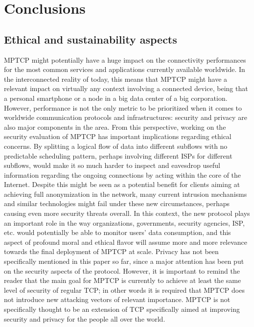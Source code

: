 \chapter{Conclusions}
\label{chap:conclusions}

\section{Ethical and sustainability aspects}
MPTCP might potentially have a huge impact on the connectivity performances for the most common services and applications currently available worldwide. In the interconnected reality of today, this means that MPTCP might have a relevant impact on virtually any context involving a connected device, being that a personal smartphone or a node in a big data center of a big corporation. 
However, performance is not the only metric to be prioritized when it comes to worldwide communication protocols and infrastructures: security and privacy are also major components in the area. From this perspective, working on the security evaluation of MPTCP has important implications regarding ethical concerns.
By splitting a logical flow of data into different subflows with no predictable scheduling pattern, perhaps involving different ISPs for different subflows, would make it so much harder to inspect and eavesdrop useful information regarding the ongoing connections by acting within the core of the Internet. Despite this might be seen as a potential benefit for clients aiming at achieving full anonymization in the network, many current intrusion mechanisms and similar technologies might fail under these new circumstances, perhaps causing even more security threats overall. In this context, the new protocol plays an important role in the way organizations, governments, security agencies, ISP, etc. would potentially be able to monitor users' data consumption, and this aspect of profound moral and ethical flavor will assume more and more relevance towards the final deployment of MPTCP at scale.
Privacy has not been specifically mentioned in this paper so far, since a major attention has been put on the security aspects of the protocol. However, it is important to remind the reader that the main goal for MPTCP is currently to achieve at least the same level of security of regular TCP; in other words it is required that MPTCP does not introduce new attacking vectors of relevant importance. MPTCP is not specifically thought to be an extension of TCP specifically aimed at improving security and privacy for the people all over the world.

